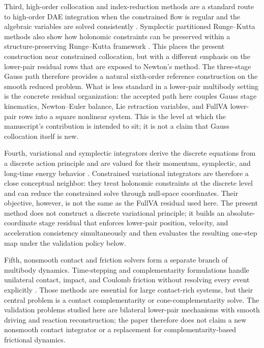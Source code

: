 \documentclass[preprint,12pt]{elsarticle}
\begin{document}
Third, high-order collocation and index-reduction methods are a standard route
to high-order DAE integration when the constrained flow is regular and the
algebraic variables are solved consistently
\cite{gear1985automatic,hairer1993solving}. Symplectic partitioned
Runge--Kutta methods also show how holonomic constraints can be preserved
within a structure-preserving Runge--Kutta framework \cite{jay1996symplectic}.
This places the present construction near constrained collocation, but with a
different emphasis on the lower-pair residual rows that are exposed to Newton's
method.
The three-stage Gauss path therefore provides a natural sixth-order reference
construction on the smooth reduced problem. What is less standard in a
lower-pair multibody setting is the concrete residual organization: the
accepted path here couples Gauss stage kinematics, Newton--Euler balance, Lie
retraction variables, and FullVA lower-pair rows into a square nonlinear
system. This is the level at which the manuscript's contribution is intended
to sit; it is not a claim that Gauss collocation itself is new.

Fourth, variational and symplectic integrators derive the discrete equations
from a discrete action principle and are valued for their momentum,
symplectic, and long-time energy behavior
\cite{marsden2001discrete,leyendecker2008variational,leok2012prolongation}.
Constrained variational integrators are therefore a close conceptual
neighbor: they treat holonomic constraints at the discrete level and can
reduce the constrained solve through null-space coordinates. Their objective,
however, is not the same as the FullVA residual used here. The present method
does not construct a discrete variational principle; it builds an
absolute-coordinate stage residual that enforces lower-pair position,
velocity, and acceleration consistency simultaneously and then evaluates the
resulting one-step map under the validation policy below.

Fifth, nonsmooth contact and friction solvers form a separate branch of
multibody dynamics. Time-stepping and complementarity formulations handle
unilateral contact, impact, and Coulomb friction without resolving every
event explicitly
\cite{stewart1996implicit,anitescu1997formulating,tasora2011matrixfree}.
Those methods are essential for large contact-rich systems, but their central
problem is a contact complementarity or cone-complementarity solve. The
validation problems studied here are bilateral lower-pair mechanisms with smooth
driving and reaction reconstruction; the paper therefore does not claim a
new nonsmooth contact integrator or a replacement for complementarity-based
frictional dynamics.
\end{document}
